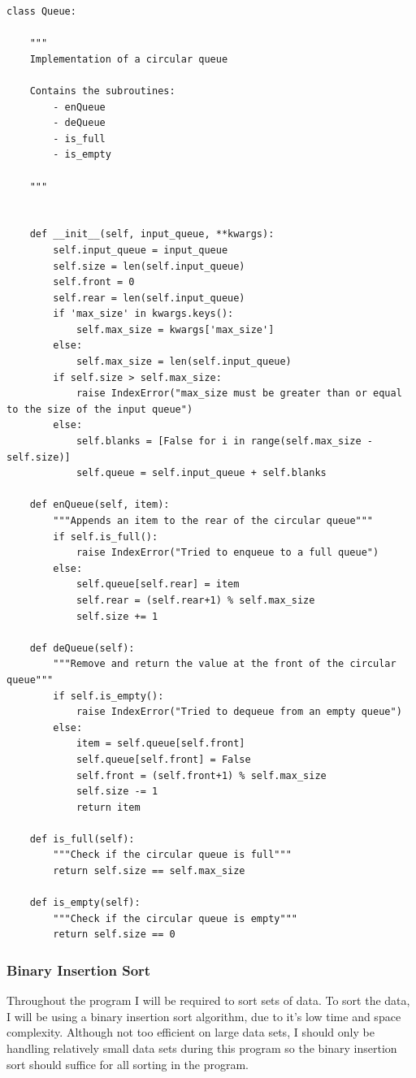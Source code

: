 \documentclass{article}
\begin{document}
\begin{lstlisting}
class Queue:

    """
    Implementation of a circular queue

    Contains the subroutines:
        - enQueue
        - deQueue
        - is_full
        - is_empty

    """


    def __init__(self, input_queue, **kwargs):
        self.input_queue = input_queue
        self.size = len(self.input_queue)
        self.front = 0
        self.rear = len(self.input_queue)
        if 'max_size' in kwargs.keys():
            self.max_size = kwargs['max_size']
        else:
            self.max_size = len(self.input_queue)
        if self.size > self.max_size:
            raise IndexError("max_size must be greater than or equal to the size of the input queue")
        else:
            self.blanks = [False for i in range(self.max_size - self.size)]
            self.queue = self.input_queue + self.blanks

    def enQueue(self, item):
        """Appends an item to the rear of the circular queue"""
        if self.is_full():
            raise IndexError("Tried to enqueue to a full queue")
        else:
            self.queue[self.rear] = item
            self.rear = (self.rear+1) % self.max_size
            self.size += 1

    def deQueue(self):
        """Remove and return the value at the front of the circular queue"""
        if self.is_empty():
            raise IndexError("Tried to dequeue from an empty queue")
        else:
            item = self.queue[self.front]
            self.queue[self.front] = False
            self.front = (self.front+1) % self.max_size
            self.size -= 1
            return item

    def is_full(self):
        """Check if the circular queue is full"""
        return self.size == self.max_size

    def is_empty(self):
        """Check if the circular queue is empty"""
        return self.size == 0
\end{lstlisting}

\clearpage
\subsubsection{Binary Insertion Sort}
Throughout the program I will be required to sort sets of data. To sort the data, I will be using a binary insertion sort algorithm, due to it's low time and space complexity. Although not too efficient on large data sets, I should only be handling relatively small data sets during this program so the binary insertion sort should suffice for all sorting in the program.
\end{document}
